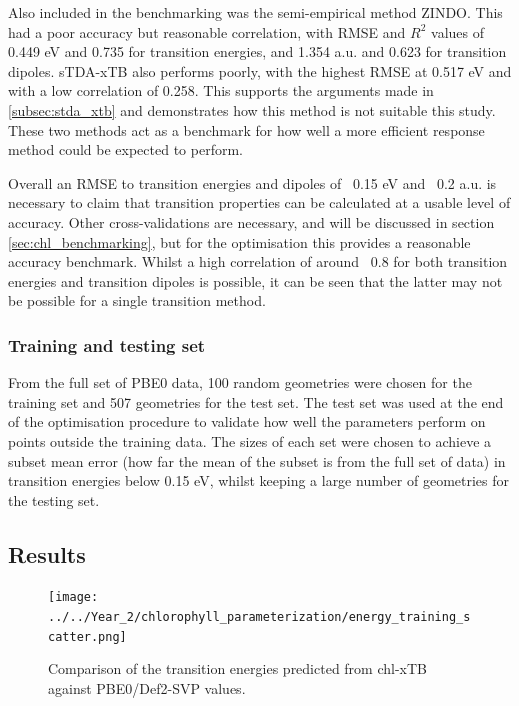 Also included in the benchmarking was the semi-empirical method ZINDO. This had a
poor accuracy but reasonable correlation, with RMSE and $R^2$ values of 0.449 eV 
and 0.735 for transition energies, and 1.354 a.u. and 0.623 for transition dipoles.
sTDA-xTB also performs poorly, with the highest RMSE at 0.517 eV and with a low 
correlation of 0.258. This supports the arguments made in \ref{subsec:stda_xtb}
and demonstrates how this method is not suitable this study. These two methods act
as a benchmark for how well a more efficient response method could be expected to
perform.

Overall an RMSE to transition energies and dipoles of ~0.15 eV and ~0.2 a.u. is 
necessary to claim that transition properties can be calculated at a usable level 
of accuracy. Other cross-validations are necessary, and will be discussed in section
\ref{sec:chl_benchmarking}, but for the optimisation this provides a reasonable 
accuracy benchmark. Whilst a high correlation of around ~0.8 for both transition 
energies and transition dipoles is possible, it can be seen that the latter may 
not be possible for a single transition method.

\subsubsection{Training and testing set}
\label{subsubsec:train_test}
From the full set of PBE0 data, 100 random geometries were chosen for the training 
set and 507 geometries for the test set. The test set was used at the end of the 
optimisation procedure to validate how well the parameters perform on points outside 
the training data. The sizes of each set were chosen to achieve a subset mean error
(how far the mean of the subset is from the full set of data) in transition energies
below 0.15 eV, whilst keeping a large number of geometries for the testing set.

\afterpartskip
\subsection{Results}
\label{subsec:chl_opt_results}

\begin{figure}
    \centering
    \texttt{[image: ../../Year\_2/chlorophyll\_parameterization/energy\_training\_scatter.png]}
    \caption{Comparison of the \Qy transition energies predicted from chl-xTB against
    PBE0/Def2-SVP values.}
    \label{fig:energy_training_scatter}
\end{figure}

